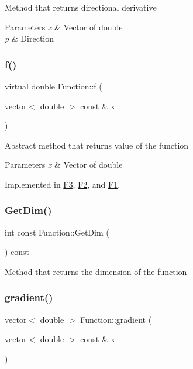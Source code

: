 Method that returns directional derivative 
\begin{DoxyParams}{Parameters}
{\em x} & Vector of double \\
\hline
{\em p} & Direction \\
\hline
\end{DoxyParams}
\mbox{\label{class_function_ae9243748f484eb1135e55120fb0ccdea}} 
\subsubsection{\texorpdfstring{f()}{f()}}
{\footnotesize\ttfamily virtual double Function\+::f (\begin{DoxyParamCaption}\item[{vector$<$ double $>$ const \&}]{x }\end{DoxyParamCaption})\hspace{0.3cm}{\ttfamily [pure virtual]}}

Abstract method that returns value of the function 
\begin{DoxyParams}{Parameters}
{\em x} & Vector of double \\
\hline
\end{DoxyParams}


Implemented in \hyperlink{class_f3_ab596b20c4e2fead179df90d7946b176a}{F3}, \hyperlink{class_f2_a0850135dbfb59ce247ac1c4f013c4873}{F2}, and \hyperlink{class_f1_ae5fee27c70b7ea338cfb791bd830297b}{F1}.

\mbox{\label{class_function_a17f5d0b86f87e21a34b4379eab93ee39}} 
\subsubsection{\texorpdfstring{Get\+Dim()}{GetDim()}}
{\footnotesize\ttfamily int const Function\+::\+Get\+Dim (\begin{DoxyParamCaption}{ }\end{DoxyParamCaption}) const}

Method that returns the dimension of the function \mbox{\label{class_function_a2ab0491b6a1e9c572b9522b08b1f4d33}} 
\subsubsection{\texorpdfstring{gradient()}{gradient()}}
{\footnotesize\ttfamily vector$<$ double $>$ Function\+::gradient (\begin{DoxyParamCaption}\item[{vector$<$ double $>$ const \&}]{x }\end{DoxyParamCaption})}

